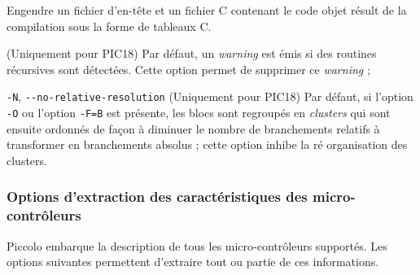 \begin{description}
  \item[\texttt{-C}, \texttt{-{-}output-c-files}] Engendre un fichier d'en-tête et un fichier C contenant le code objet résult de la compilation sous la forme de tableaux C.


  \item[\texttt{-R}, \texttt{-{-}no-warning-on-recursive-routines}] (Uniquement pour PIC18) Par défaut, un \emph{warning} est émis si des routines récursives sont détectées. Cette option permet de supprimer ce \emph{warning} ;

  \item \texttt{-N}, \texttt{-{-}no-relative-resolution} (Uniquement pour PIC18) Par défaut, si l'option \texttt{-O} ou l'option \texttt{-F=B} est présente, les blocs sont regroupés en \emph{clusters} qui sont ensuite ordonnés de façon à diminuer le nombre de branchements relatifs à transformer en branchements absolus ; cette option inhibe la ré organisation des clusters.

\end{description}



\subsubsection{Options d'extraction des caractéristiques des micro-contrôleurs}

Piccolo embarque la description de tous les micro-contrôleurs supportés. Les options suivantes permettent d'extraire tout ou partie de ces informations.

